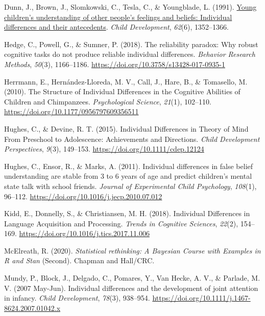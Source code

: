 \documentclass[
  man,floatsintext]{apa6}
\newlength{\cslhangindent}
\newlength{\cslentryspacingunit} %
\newenvironment{CSLReferences}[2] %
 {%
  \setlength{\parindent}{0pt}
  \ifodd #1
  \let\oldpar\par
  \def\par{\hangindent=\cslhangindent\oldpar}
  \fi
  \setlength{\parskip}{#2\cslentryspacingunit}
 }%
 {}
\begin{document}
\begin{CSLReferences}{1}{0}
\leavevmode{}%
Dunn, J., Brown, J., Slomkowski, C., Tesla, C., \& Youngblade, L. (1991). \href{https://www.ncbi.nlm.nih.gov/pubmed/1786720}{Young children's understanding of other people's feelings and beliefs: Individual differences and their antecedents}. \emph{Child Development}, \emph{62}(6), 1352--1366.

\leavevmode{}%
Hedge, C., Powell, G., \& Sumner, P. (2018). The reliability paradox: {Why} robust cognitive tasks do not produce reliable individual differences. \emph{Behavior Research Methods}, \emph{50}(3), 1166--1186. \url{https://doi.org/10.3758/s13428-017-0935-1}

\leavevmode{}%
Herrmann, E., Hernández-Lloreda, M. V., Call, J., Hare, B., \& Tomasello, M. (2010). The {Structure} of {Individual Differences} in the {Cognitive Abilities} of {Children} and {Chimpanzees}. \emph{Psychological Science}, \emph{21}(1), 102--110. \url{https://doi.org/10.1177/0956797609356511}

\leavevmode{}%
Hughes, C., \& Devine, R. T. (2015). Individual {Differences} in {Theory} of {Mind From Preschool} to {Adolescence}: {Achievements} and {Directions}. \emph{Child Development Perspectives}, \emph{9}(3), 149--153. \url{https://doi.org/10.1111/cdep.12124}

\leavevmode{}%
Hughes, C., Ensor, R., \& Marks, A. (2011). Individual differences in false belief understanding are stable from 3 to 6 years of age and predict children's mental state talk with school friends. \emph{Journal of Experimental Child Psychology}, \emph{108}(1), 96--112. \url{https://doi.org/10.1016/j.jecp.2010.07.012}

\leavevmode{}%
Kidd, E., Donnelly, S., \& Christiansen, M. H. (2018). Individual {Differences} in {Language Acquisition} and {Processing}. \emph{Trends in Cognitive Sciences}, \emph{22}(2), 154--169. \url{https://doi.org/10.1016/j.tics.2017.11.006}

\leavevmode{}%
McElreath, R. (2020). \emph{Statistical rethinking: {A Bayesian Course} with {Examples} in {R} and {Stan}} (Second). {Chapman and Hall/CRC}.

\leavevmode{}%
Mundy, P., Block, J., Delgado, C., Pomares, Y., Van Hecke, A. V., \& Parlade, M. V. (2007 May-Jun). Individual differences and the development of joint attention in infancy. \emph{Child Development}, \emph{78}(3), 938--954. \url{https://doi.org/10.1111/j.1467-8624.2007.01042.x}


\end{CSLReferences}
\end{document}
